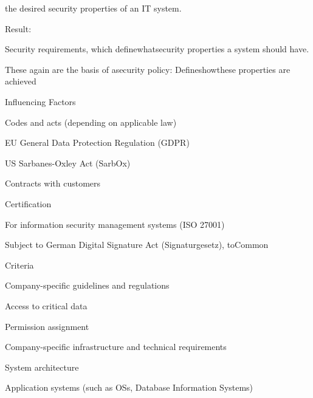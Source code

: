 \documentclass[a4paper]{article}
\begin{document}
\begin{multicols}{3}
    the desired security properties of an IT system.

    Result:
    \begin{itemize*}
        \item Security requirements, which definewhatsecurity properties a system should have.
        \item These again are the basis of asecurity policy: Defineshowthese properties are achieved
    \end{itemize*}

    Influencing Factors
    \begin{itemize*}
        \item Codes and acts (depending on applicable law)
              \begin{itemize*}
                  \item EU General Data Protection Regulation (GDPR)
                  \item US Sarbanes-Oxley Act (SarbOx)
              \end{itemize*}
        \item Contracts with customers
        \item Certification
              \begin{itemize*}
                  \item For information security management systems (ISO 27001)
                  \item Subject to German Digital Signature Act (Signaturgesetz), toCommon
              \end{itemize*}
        \item Criteria
        \item Company-specific guidelines and regulations
              \begin{itemize*}
                  \item Access to critical data
                  \item Permission assignment
              \end{itemize*}
        \item Company-specific infrastructure and technical requirements
              \begin{itemize*}
                  \item System architecture
                  \item Application systems (such as OSs, Database Information Systems)
              \end{itemize*}
    \end{itemize*}


\end{multicols}
\end{document}

